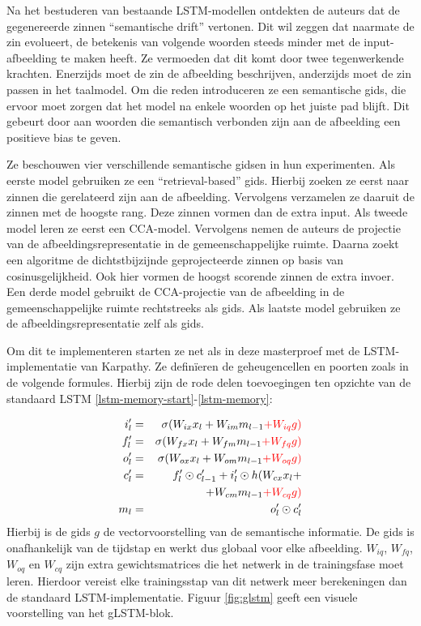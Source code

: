 Na het bestuderen van bestaande LSTM-modellen ontdekten de auteurs dat de gegenereerde zinnen ``semantische drift'' vertonen. Dit wil zeggen dat naarmate de zin evolueert, de betekenis van volgende woorden steeds minder met de input-afbeelding te maken heeft. Ze vermoeden dat dit komt door twee tegenwerkende krachten. Enerzijds moet de zin de afbeelding beschrijven, anderzijds moet de zin passen in het taalmodel. Om die reden introduceren ze een semantische gids, die ervoor moet zorgen dat het model na enkele woorden op het juiste pad blijft. Dit gebeurt door aan woorden die semantisch verbonden zijn aan de afbeelding een positieve bias te geven.

Ze beschouwen vier verschillende semantische gidsen in hun experimenten. Als eerste model gebruiken ze een ``retrieval-based'' gids. Hierbij zoeken ze eerst naar zinnen die gerelateerd zijn aan de afbeelding. Vervolgens verzamelen ze daaruit de zinnen met de hoogste rang. Deze zinnen vormen dan de extra input.
Als tweede model leren ze eerst een CCA-model. Vervolgens nemen de auteurs de projectie van de afbeeldingsrepresentatie in de gemeenschappelijke ruimte. Daarna zoekt een algoritme de dichtstbijzijnde geprojecteerde zinnen op basis van cosinusgelijkheid. Ook hier vormen de hoogst scorende zinnen de extra invoer.
Een derde model gebruikt de CCA-projectie van de afbeelding in de gemeenschappelijke ruimte rechtstreeks als gids.
Als laatste model gebruiken ze de afbeeldingsrepresentatie zelf als gids.

Om dit te implementeren starten ze net als in deze masterproef met de LSTM-implementatie van Karpathy. Ze defin\"ieren de geheugencellen en poorten zoals in de volgende formules. Hierbij zijn de rode delen toevoegingen ten opzichte van de standaard LSTM \ref{lstm-memory-start}-\ref{lstm-memory}:

%
\begin{eqnarray}
\vspace{-3mm}
\label{glstm-memory-start}
i_l' & = & \sigma (W_{ix} x_l + W_{im} m_{l-1} \color{red}{+ W_{iq} g}) \label{glstm-input} \\
f_l' & = & \sigma (W_{fx} x_l + W_{fm} m_{l-1} \color{red}{+ W_{fq} g}) \\
o_l' & = & \sigma (W_{ox} x_l + W_{om} m_{l-1} \color{red}{+ W_{oq} g}) \\
c_l' & = & f_l' \odot c_{l-1}' + i_l' \odot h(W_{cx} x_l + \nonumber \\
&   & + W_{cm} m_{l-1} \color{red}{+ W_{cq} g}) \\
m_l & = & o_l' \odot c_l'
\label{glstm-memory}
\vspace{-3mm}
\end{eqnarray}
Hierbij is de gids $g$ de vectorvoorstelling van de semantische informatie. De gids is onafhankelijk van de tijdstap en werkt dus globaal voor elke afbeelding. $W_{iq}$, $W_{fq}$, $W_{oq}$ en $W_{cq}$ zijn extra gewichtsmatrices die het netwerk in de trainingsfase moet leren. Hierdoor vereist elke trainingsstap van dit netwerk meer berekeningen dan de standaard LSTM-implementatie. Figuur \ref{fig:glstm} geeft een visuele voorstelling van het gLSTM-blok.

